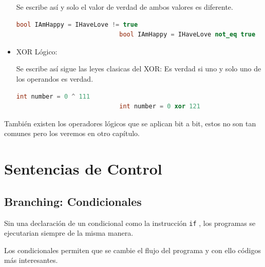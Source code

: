 \documentclass[12pt, fleqn]{report}                             %
\theoremstyle{break}                                            %
\newcommand{\textCode}[1]  { \texttt{#1} }                      %
\begin{document}
\begin{itemize}
                        Se escribe así y solo el valor de verdad de ambos valores es diferente.
                        \begin{lstlisting}[language=C++, gobble=28]
                            bool IAmHappy = IHaveLove != true
                            bool IAmHappy = IHaveLove not_eq true
                        \end{lstlisting}

                    \item XOR Lógico: 
                    
                        Se escribe así sigue las leyes clasicas del XOR: Es verdad si uno y solo uno de los operandos
                        es verdad.
                        \begin{lstlisting}[language=C++, gobble=28]
                            int number = 0 ^ 111
                            int number = 0 xor 121
                        \end{lstlisting}
                \end{itemize}

            También existen los operadores lógicos que se aplican bit a bit, estos no son tan comunes
            pero los veremos en otro capítulo.


        \clearpage
        \section{Sentencias de Control}

            \subsection{Branching: Condicionales}

                Sin una declaración de un condicional como la instrucción \textCode{if}, los programas
                se ejecutarian siempre de la misma manera.
                
                Los condicionales permiten que se cambie el flujo del programa y con ello códigos
                más interesantes.
\end{document}
